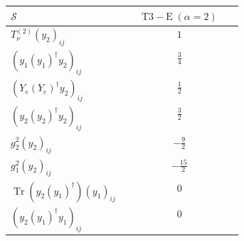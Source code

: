 \documentclass[9pt]{article}
\begin{document}
\begin{longtable}{@{}p{0.38\linewidth}c@{}}
\toprule
$\mathcal{S}$ & $ \mathrm{T3-E}\;(\alpha=2) $ \\
\midrule
$ T_{\nu}^{(2)} (y_2)_{ij} $ & $ 1 $ \\
$ (y_1 (y_1)^{\dagger} y_2)_{ij} $ & $ \frac{3}{4} $ \\
$ (Y_e (Y_e)^{\dagger} y_2)_{ij} $ & $ \frac{1}{2} $ \\
$ (y_2 (y_2)^{\dagger} y_2)_{ij} $ & $ \frac{3}{2} $ \\
$ g_2^2 (y_2)_{ij} $ & $ - \frac{9}{2} $ \\
$ g_1^2 (y_2)_{ij} $ & $ - \frac{15}{2} $ \\
$ \operatorname{Tr}\!(y_2 (y_1)^{\dagger}) (y_1)_{ij} $ & $0$ \\
$ (y_2 (y_1)^{\dagger} y_1)_{ij} $ & $0$ \\
\bottomrule
\end{longtable}
\end{document}
